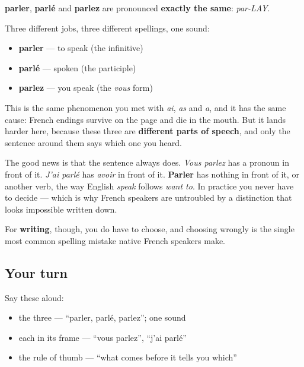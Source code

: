 \begin{grammarlens}[title={Grammar Lens: your ear gets no help at all}]
\textbf{parler}, \textbf{parlé} and \textbf{parlez} are pronounced \textbf{exactly the same}: \emph{par-LAY}.

Three different jobs, three different spellings, one sound:

\begin{itemize}
\raggedright
  \item \textbf{parler} — to speak (the infinitive)
  \item \textbf{parlé} — spoken (the participle)
  \item \textbf{parlez} — you speak (the \emph{vous} form)
\end{itemize}

This is the same phenomenon you met with \emph{ai}, \emph{as} and \emph{a}, and it has the same cause: French endings survive on the page and die in the mouth. But it lands harder here, because these three are \textbf{different parts of speech}, and only the sentence around them says which one you heard.

The good news is that the sentence always does. \emph{Vous parlez} has a pronoun in front of it. \emph{J'ai parlé} has \emph{avoir} in front of it. \textbf{Parler} has nothing in front of it, or another verb, the way English \emph{speak} follows \emph{want to}. In practice you never have to decide — which is why French speakers are untroubled by a distinction that looks impossible written down.

For \textbf{writing}, though, you do have to choose, and choosing wrongly is the single most common spelling mistake native French speakers make.
\end{grammarlens}

\subsection*{Your turn}
Say these aloud:

\begin{itemize}
\raggedright
  \item the three — \textquotedblleft{}parler, parlé, parlez\textquotedblright{}; one sound
  \item each in its frame — \textquotedblleft{}vous parlez\textquotedblright{}, \textquotedblleft{}j'ai parlé\textquotedblright{}
  \item the rule of thumb — \textquotedblleft{}what comes before it tells you which\textquotedblright{}
\end{itemize}

